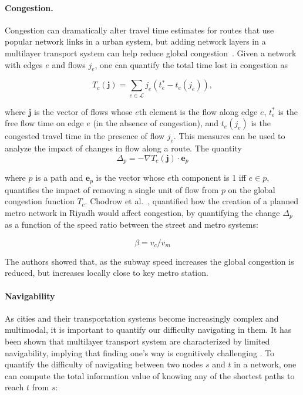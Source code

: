 \paragraph{Congestion.} 
Congestion can dramatically alter travel time estimates for routes that use popular network links in a urban system, but adding network layers in a multilayer transport system can help reduce global congestion~\cite{chodrow2016congestion}. Given a network with edges $e$ and flows $j_e$, one can quantify the total time lost in congestion as 

\begin{equation}
    T_c(\textbf{j})=\sum_{e\in \mathcal{L}}j_e(t_e^* - t_e(j_e)),
\end{equation}

where $\textbf{j}$ is the vector of flows whose $e$th element is the flow along edge $e$, $t_e^*$ is the free flow time on edge $e$ (in the absence of congestion), and $t_e(j_e)$ is the congested travel time in the presence of flow $j_e$. 
This measures can be used to analyze the impact of changes in flow along a route. The quantity
\begin{equation}
    \Delta_p = - \nabla T_c(\textbf{j}) \cdot \textbf{e}_p
\end{equation}

where $p$ is a path and $\textbf{e}_p$ is the vector whose $e$th component is 1 iff $e \in p$, quantifies the impact of removing a single unit of flow from $p$ on the global congestion function $T_c$. 
Chodrow et al.~\cite{chodrow2016congestion}, quantified how the creation of a planned metro network in Riyadh would affect congestion, by quantifying the change $\Delta_p$ as a function of the speed ratio between the street and metro systems:

\begin{equation}
    \beta = v_{c}/v_{m}
\end{equation}

The authors showed that, as the subway speed increases the global congestion is reduced, but increases locally close to key metro station.

\paragraph{Navigability} 
As cities and their transportation systems become increasingly complex and multimodal, it is important to quantify our difficulty navigating in them. It has been shown that multilayer transport system are characterized by limited navigability, implying that finding one's way is cognitively challenging \cite{gallotti2016limits}. To quantify the difficulty of navigating between two nodes $s$ and $t$ in a network, one can compute the total information value of knowing any of the shortest paths to reach $t$ from $s$:

